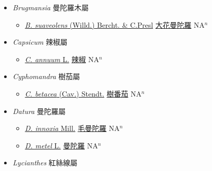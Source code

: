 
  \begin{itemize}
 \item[] \textit{Brugmansia} 曼陀羅木屬
                    
  \begin{itemize}
        \item[] \href{http://www.theplantlist.org/tpl1.1/search?q=Brugmansia+suaveolens}{\textit{B. suaveolens} (Willd.) Bercht. \& C.Presl}   \href{\detokenize{http://taibnet.sinica.edu.tw/chi/taibnet_species_list.php?T2=大花曼陀羅&T2_new_value=true&fr=y}}{大花曼陀羅} NA$^n$
  \end{itemize}
 \item[] \textit{Capsicum} 辣椒屬
                    
  \begin{itemize}
        \item[] \href{http://www.theplantlist.org/tpl1.1/search?q=Capsicum+annuum}{\textit{C. annuum} L.}   \href{\detokenize{http://taibnet.sinica.edu.tw/chi/taibnet_species_list.php?T2=辣椒&T2_new_value=true&fr=y}}{辣椒} NA$^n$
  \end{itemize}
 \item[] \textit{Cyphomandra} 樹茄屬
                    
  \begin{itemize}
        \item[] \href{http://www.theplantlist.org/tpl1.1/search?q=Cyphomandra+betacea}{\textit{C. betacea} (Cav.) Stendt.}   \href{\detokenize{http://taibnet.sinica.edu.tw/chi/taibnet_species_list.php?T2=樹番茄&T2_new_value=true&fr=y}}{樹番茄} NA$^n$
  \end{itemize}
 \item[] \textit{Datura} 曼陀羅屬
                    
  \begin{itemize}
        \item[] \href{http://www.theplantlist.org/tpl1.1/search?q=Datura+innoxia}{\textit{D. innoxia} Mill.}     \href{\detokenize{http://taibnet.sinica.edu.tw/chi/taibnet_species_list.php?T2=毛曼陀羅&T2_new_value=true&fr=y}}{毛曼陀羅} NA$^n$
        \item[] \href{http://www.theplantlist.org/tpl1.1/search?q=Datura+metel}{\textit{D. metel} L.}   \href{\detokenize{http://taibnet.sinica.edu.tw/chi/taibnet_species_list.php?T2=曼陀羅&T2_new_value=true&fr=y}}{曼陀羅} NA$^n$
  \end{itemize}
 \item[] \textit{Lycianthes} 紅絲線屬
                    

\end{itemize}
